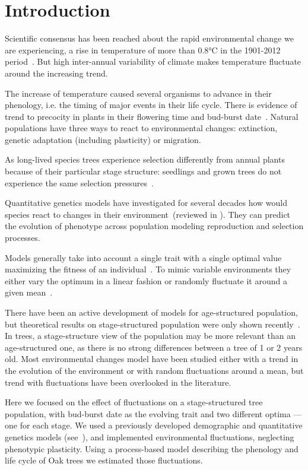 \label{sec:Intro}
\section*{Introduction}

Scientific consensus has been reached about the rapid environmental change we are experiencing, a rise in temperature of more than 0.8°C in the 1901-2012 period~\citep{stocker_ipcc_2013}. But high inter-annual variability of climate makes temperature fluctuate around the increasing trend.

The increase of temperature caused several organisms to advance in their phenology, i.e. the timing of major events in their life cycle. There is evidence of trend to precocity in plants in their flowering time and bud-burst date~\citep{alberto_adaptive_2011, gienapp_predicting_2013}. Natural populations have three ways to react to environmental changes: extinction, genetic adaptation (including plasticity) or migration.

As long-lived species trees experience selection differently from annual plants because of their particular stage structure: seedlings and grown trees do not experience the same selection pressures~\citep{lande_quantitative_1982, coulson_dynamics_2008, barfield_evolution_2011, engen_evolution_2011}.

Quantitative genetics models have investigated for several decades how would species react to changes in their environment~(reviewed in \citealt{burger_quantitative-genetic_2004}). They can predict the evolution of phenotype across population modeling reproduction and selection processes.

Models generally take into account a single trait with a single optimal value maximizing the fitness of an individual~\citep{lande_quantitative_1982}. To mimic variable environments they either vary the optimum in a linear fashion or randomly fluctuate it around a given mean~\citep{lande_role_1996}.

There have been an active development of models for age-structured population, but theoretical results on stage-structured population were only shown recently~\citep{engen_evolution_2011}. In trees, a stage-structure view of the population may be more relevant than an age-structured one, as there is no strong differences between a tree of 1 or 2 years old. Most environmental changes model have been studied either with a trend in the evolution of the environment or with random fluctuations around a mean, but trend with fluctuations have been overlooked in the literature.

Here we focused on the effect of fluctuations on a stage-structured tree population, with bud-burst date as the evolving trait and two different optima — one for each stage.
We used a previously developed demographic and quantitative genetics models (see~), and implemented environmental fluctuations, neglecting phenotypic plasticity. Using a process-based model describing the phenology and life cycle of Oak trees we estimated those fluctuations.